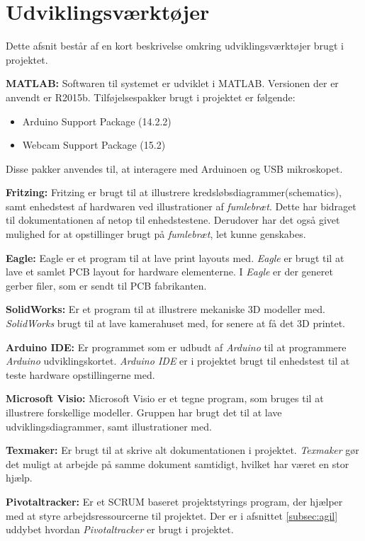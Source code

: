 \newpage
\section{Udviklingsværktøjer}
Dette afsnit består af en kort beskrivelse omkring udviklingsværktøjer brugt i projektet.

\textbf{MATLAB:} Softwaren til systemet er udviklet i MATLAB. Versionen der er anvendt er R2015b. Tilføjelsespakker brugt i projektet er følgende:
\begin{itemize}
\item Arduino Support Package (14.2.2)
\item Webcam Support Package (15.2)
\end{itemize}
Disse pakker anvendes til, at interagere med Arduinoen og USB mikroskopet. 

\textbf{Fritzing:} Fritzing er brugt til at illustrere kredsløbsdiagrammer(schematics), samt enhedstest af hardwaren ved illustrationer af \textit{fumlebræt}. Dette har bidraget til dokumentationen af netop til enhedstestene. Derudover har det også givet mulighed for at opstillinger brugt på \textit{fumlebræt}, let kunne genskabes.

\textbf{Eagle:} Eagle er et program til at lave print layouts med. \textit{Eagle} er brugt til at lave et samlet PCB layout for hardware elementerne. I \textit{Eagle} er der generet gerber filer, som er sendt til PCB fabrikanten.

\textbf{SolidWorks:} Er et program til at illustrere mekaniske 3D modeller med.  \textit{SolidWorks} brugt til at lave kamerahuset med, for senere at få det 3D printet.

\textbf{Arduino IDE:} Er programmet som er udbudt af \textit{Arduino} til at programmere \textit{Arduino} udviklingskortet. \textit{Arduino IDE} er i projektet brugt til enhedstest til at teste hardware opstillingerne med. 

\textbf{Microsoft Visio:} Microsoft Visio er et tegne program, som bruges til at illustrere forskellige modeller. Gruppen har brugt det til at lave udviklingsdiagrammer, samt illustrationer med. 

\textbf{Texmaker:} Er brugt til at skrive alt dokumentationen i projektet. \textit{Texmaker} gør det muligt at arbejde på samme dokument samtidigt, hvilket har været en stor hjælp.

\textbf{Pivotaltracker:} Er et SCRUM baseret projektstyrings program, der hjælper med at styre arbejdsressourcerne til projektet. Der er i afsnittet \ref{subsec:agil} uddybet hvordan \textit{Pivotaltracker} er brugt i projektet.

